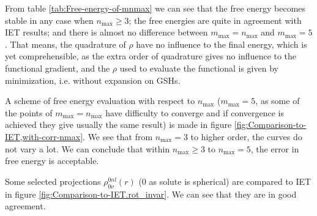 From table \ref{tab:Free-energy-of-mnmax} we can see that the free
energy becomes stable in any case when $n_{\max}\geq3$; the free
energies are quite in agreement with \acs{IET} results; and there
is almost no difference between $m_{\max}=n_{\max}$ and $m_{\max}=5$.
That means, the quadrature of $\rho$ have no influence to the final
energy, which is yet comprehensible, as the extra order of quadrature
gives no influence to the functional gradient, and the $\rho$ used
to evaluate the functional is given by minimization, i.e. without
expansion on \acs{GSH}s.

A scheme of free energy evaluation with respect to $n_{\max}$ ($m_{\max}=5$,
as some of the points of $m_{\max}=n_{\max}$ have difficulty to converge
and if convergence is achieved they give usually the same result)
is made in figure \ref{fig:Comparison-to-IET,with-corr-nmax}. We
see that from $n_{\max}=3$ to higher order, the curves do not vary
a lot. We can conclude that within $n_{\max}\geq3$ to $n_{\max}=5$,
the error in free energy is acceptable.

Some selected projections $\rho_{0\nu}^{0nl}(r)$ (0 as solute is
spherical) are compared to \acs{IET} in figure \ref{fig:Comparison-to-IET.rot_invar}.
We can see that they are in good agreement.

